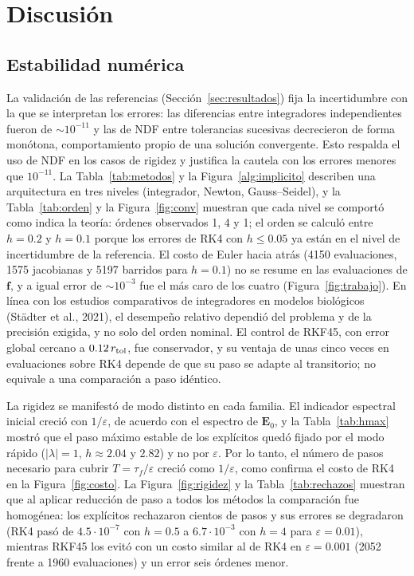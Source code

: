 \section{Discusión}\label{sec:discusion}
\subsection{Estabilidad numérica}
La validación de las referencias (Sección~\ref{sec:resultados}) fija la incertidumbre con la que se interpretan los errores: las diferencias entre integradores independientes fueron de $\sim10^{-11}$ y las de NDF entre tolerancias sucesivas decrecieron de forma monótona, comportamiento propio de una solución convergente. Esto respalda el uso de NDF en los casos de rigidez y justifica la cautela con los errores menores que $10^{-11}$. La Tabla~\ref{tab:metodos} y la Figura~\ref{alg:implicito} describen una arquitectura en tres niveles (integrador, Newton, Gauss--Seidel), y la Tabla~\ref{tab:orden} y la Figura~\ref{fig:conv} muestran que cada nivel se comportó como indica la teoría: órdenes observados 1, 4 y 1; el orden se calculó entre $h=0.2$ y $h=0.1$ porque los errores de RK4 con $h\le0.05$ ya están en el nivel de incertidumbre de la referencia. El costo de Euler hacia atrás (4150 evaluaciones, 1575 jacobianas y 5197 barridos para $h=0.1$) no se resume en las evaluaciones de $\mathbf f$, y a igual error de $\sim10^{-3}$ fue el más caro de los cuatro (Figura~\ref{fig:trabajo}). En línea con los estudios comparativos de integradores en modelos biológicos (Städter et al., 2021), el desempeño relativo dependió del problema y de la precisión exigida, y no solo del orden nominal. El control de RKF45, con error global cercano a $0.12\,r_{\rm tol}$, fue conservador, y su ventaja de unas cinco veces en evaluaciones sobre RK4 depende de que su paso se adapte al transitorio; no equivale a una comparación a paso idéntico.

La rigidez se manifestó de modo distinto en cada familia. El indicador espectral inicial creció con $1/\varepsilon$, de acuerdo con el espectro de $\mathbf E_0$, y la Tabla~\ref{tab:hmax} mostró que el paso máximo estable de los explícitos quedó fijado por el modo rápido ($|\lambda|=1$, $h\approx2.04$ y $2.82$) y no por $\varepsilon$. Por lo tanto, el número de pasos necesario para cubrir $T=\tau_f/\varepsilon$ creció como $1/\varepsilon$, como confirma el costo de RK4 en la Figura~\ref{fig:costo}. La Figura~\ref{fig:rigidez} y la Tabla~\ref{tab:rechazos} muestran que al aplicar reducción de paso a todos los métodos la comparación fue homogénea: los explícitos rechazaron cientos de pasos y sus errores se degradaron (RK4 pasó de $4.5\cdot10^{-7}$ con $h=0.5$ a $6.7\cdot10^{-3}$ con $h=4$ para $\varepsilon=0.01$), mientras RKF45 los evitó con un costo similar al de RK4 en $\varepsilon=0.001$ (2052 frente a 1960 evaluaciones) y un error seis órdenes menor.

